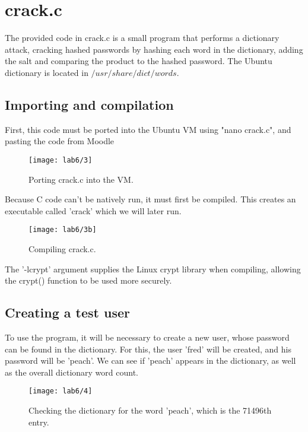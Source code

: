 \section{crack.c}\label{sec:crack.c}
The provided code in crack.c is a small program that performs a dictionary attack,
cracking hashed passwords by hashing each word in the dictionary, adding the salt
and comparing the product to the hashed password.
The Ubuntu dictionary is located in $/usr/share/dict/words$.

\subsection{Importing and compilation}\label{subsec:importing-and-compilation}
First, this code must be ported into the Ubuntu VM using "nano crack.c", and pasting the code from Moodle

\begin{figure}[H]
    \centering
    \texttt{[image: lab6/3]}
    \caption{Porting crack.c into the VM.}
    \label{fig:nanoCrackC}
\end{figure}

Because C code can't be natively run, it must first be compiled.
This creates an executable called 'crack' which we will later run.

\begin{figure}[H]
    \centering
    \texttt{[image: lab6/3b]}
    \caption{Compiling crack.c.}
    \label{fig:compile}
\end{figure}

The '-lcrypt' argument supplies the Linux crypt library when compiling, allowing the crypt() function
to be used more securely.

\pagebreak

\subsection{Creating a test user}\label{subsec:creating-a-test-user}
To use the program, it will be necessary to create a new user, whose password can be found in the dictionary.
For this, the user 'fred' will be created, and his password will be 'peach'.
We can see if 'peach' appears in the dictionary, as well as the overall dictionary word count.

\begin{figure}[H]
    \centering
    \texttt{[image: lab6/4]}
    \caption{Checking the dictionary for the word 'peach', which is the 71496th entry.}
    \label{fig:checkDict}
\end{figure}

